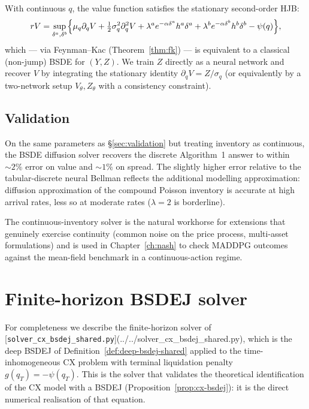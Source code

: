 With continuous $q$, the value function satisfies the stationary second-order HJB:
\begin{equation}
  r V = \sup_{\delta^a, \delta^b}\Bigl\{\mu_q \partial_q V + \tfrac{1}{2} \sigma_q^2 \partial_q^2 V + \lambda^a e^{-\alpha \delta^a} h^a \delta^a + \lambda^b e^{-\alpha \delta^b} h^b \delta^b - \psi(q)\Bigr\},
\end{equation}
which --- via Feynman--Kac (Theorem~\ref{thm:fk}) --- is equivalent to a classical (non-jump) BSDE for $(Y, Z)$. We train $Z$ directly as a neural network and recover $V$ by integrating the stationary identity $\partial_q V = Z / \sigma_q$ (or equivalently by a two-network setup $V_\theta, Z_\theta$ with a consistency constraint).

\subsection{Validation}

On the same parameters as \S\ref{sec:validation} but treating inventory as continuous, the BSDE diffusion solver recovers the discrete Algorithm~1 answer to within $\sim 2\%$ error on value and $\sim 1\%$ on spread. The slightly higher error relative to the tabular-discrete neural Bellman reflects the additional modelling approximation: diffusion approximation of the compound Poisson inventory is accurate at high arrival rates, less so at moderate rates ($\lambda = 2$ is borderline).

The continuous-inventory solver is the natural workhorse for extensions that genuinely exercise continuity (common noise on the price process, multi-asset formulations) and is used in Chapter~\ref{ch:nash} to check MADDPG outcomes against the mean-field benchmark in a continuous-action regime.

\section{Finite-horizon BSDEJ solver}
\label{sec:finite-horizon-bsdej}

For completeness we describe the finite-horizon solver of [\texttt{solver\_cx\_bsdej\_shared.py}](../../solver_cx_bsdej_shared.py), which is the deep BSDEJ of Definition~\ref{def:deep-bsdej-shared} applied to the time-inhomogeneous CX problem with terminal liquidation penalty $g(q_T) = -\psi(q_T)$. This is the solver that validates the theoretical identification of the CX model with a BSDEJ (Proposition~\ref{prop:cx-bsdej}): it is the direct numerical realisation of that equation.

